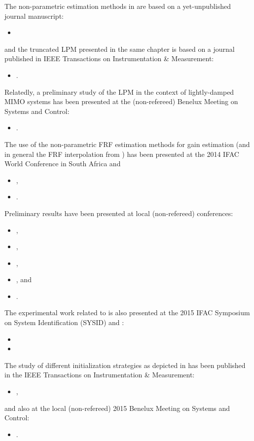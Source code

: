\begin{refsection}
The non-parametric estimation methods in  are based on a yet-unpublished journal manuscript:
\begin{itemize}
  \item {}
\end{itemize}
and the truncated \gls{LPM} presented in the same chapter is based on a journal published in \gls{IEEE} Transactions on Instrumentation \& Measurement:
\begin{itemize}
  \item {}.
\end{itemize}
Relatedly, a preliminary study of the \gls{LPM} in the context of lightly-damped \gls{MIMO} systems has been presented at the (non-refereed) Benelux Meeting on Systems and Control:
\begin{itemize}
    \item {}.
\end{itemize}


The use of the non-parametric \gls{FRF} estimation methods for \Hinf gain estimation (and in general the \gls{FRF} interpolation from ) has been presented at the 2014 \gls{IFAC} World Conference in South Africa and 
\begin{itemize}
  \item {},
  \item {}.
\end{itemize}
Preliminary results have been presented at local (non-refereed) conferences:
\begin{itemize}
  \item {},
  \item {},
  \item {},
  \item {}, and
  \item {}.
\end{itemize}
The experimental work related to  is also presented at the 2015 \gls{IFAC} Symposium on System Identification (\textsc{SYSID}) and :
\begin{itemize}
  \item {}
  \item {}
\end{itemize}

The study of different initialization strategies as depicted in  has been published in the \gls{IEEE} Transactions on Instrumentation \& Measurement:
\begin{itemize}
  \item {},
\end{itemize}
and also at the local (non-refereed) 2015 Benelux Meeting on Systems and Control:
\begin{itemize}
    \item {}.
\end{itemize}


\end{refsection}

